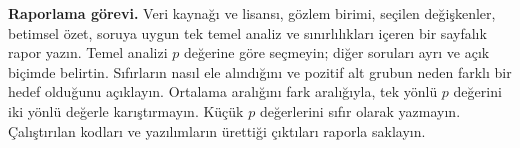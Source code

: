 \textbf{Raporlama görevi.} Veri kaynağı ve lisansı, gözlem birimi,
seçilen değişkenler, betimsel özet, soruya uygun tek temel analiz
ve sınırlılıkları içeren bir sayfalık rapor yazın. Temel analizi
$p$ değerine göre seçmeyin; diğer soruları ayrı ve açık biçimde
belirtin. Sıfırların nasıl ele alındığını ve pozitif alt grubun
neden farklı bir hedef olduğunu açıklayın. Ortalama aralığını
fark aralığıyla, tek yönlü $p$ değerini iki yönlü değerle
karıştırmayın. Küçük $p$ değerlerini sıfır olarak yazmayın.
Çalıştırılan kodları ve yazılımların ürettiği çıktıları raporla saklayın.